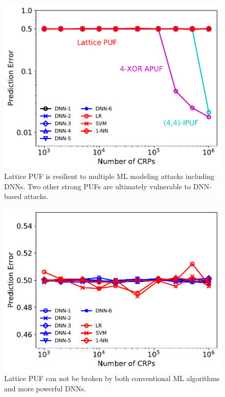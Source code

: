 \begin{figure}[t!]
\centering
\includegraphics[width = 0.7\linewidth]{./figs/ml_attack_dnn_all_puf_5_new.pdf}
\caption{Lattice PUF is resilient to multiple ML modeling attacks including DNNs. Two other strong PUFs are ultimately vulnerable to DNN-based attacks.}
\label{fig:ml_attack_2}
\end{figure}

\begin{figure}[t!]
\centering
\includegraphics[width = 0.7\linewidth]{./figs/ml_attack_lattice_puf_new.pdf}
\caption{Lattice PUF can not be broken by both conventional ML algorithms and more powerful DNNs.}
\label{fig:ml_attack_3}
\end{figure}


